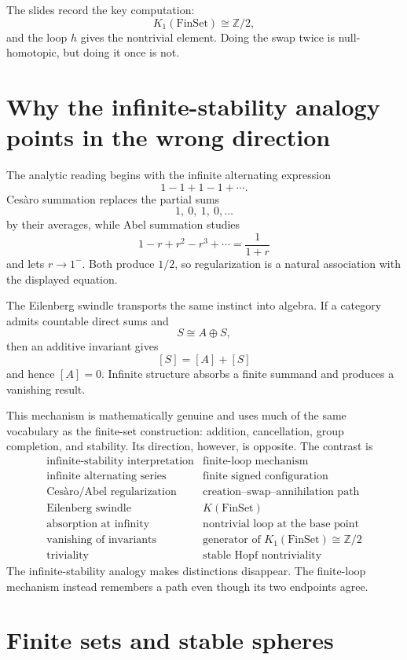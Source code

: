 The slides record the key computation:
\[
  K_1(\mathrm{FinSet})\cong\mathbb Z/2,
\]
and the loop \(h\) gives the nontrivial element.  Doing the swap twice is null-homotopic, but doing it once is not.

\section{Why the infinite-stability analogy points in the wrong direction}

The analytic reading begins with the infinite alternating expression
\[
  1-1+1-1+\cdots.
\]
Ces\`aro summation replaces the partial sums
\[
  1,\ 0,\ 1,\ 0,\ldots
\]
by their averages, while Abel summation studies
\[
  1-r+r^2-r^3+\cdots=\frac{1}{1+r}
\]
and lets \(r\to1^-\).  Both produce \(1/2\), so regularization is a natural association with the displayed equation.

The Eilenberg swindle transports the same instinct into algebra.  If a category admits countable direct sums and
\[
  S\cong A\oplus S,
\]
then an additive invariant gives
\[
  [S]=[A]+[S]
\]
and hence \([A]=0\).  Infinite structure absorbs a finite summand and produces a vanishing result.

This mechanism is mathematically genuine and uses much of the same vocabulary as the finite-set construction: addition, cancellation, group completion, and stability.  Its direction, however, is opposite.  The contrast is
\[
\begin{array}{c|c}
\text{infinite-stability interpretation} & \text{finite-loop mechanism}\\
\hline
\text{infinite alternating series} & \text{finite signed configuration}\\
\text{Ces\`aro/Abel regularization} & \text{creation--swap--annihilation path}\\
\text{Eilenberg swindle} & K(\mathrm{FinSet})\\
\text{absorption at infinity} & \text{nontrivial loop at the base point}\\
\text{vanishing of invariants} & \text{generator of }K_1(\mathrm{FinSet})\cong\mathbb Z/2\\
\text{triviality} & \text{stable Hopf nontriviality}
\end{array}
\]
The infinite-stability analogy makes distinctions disappear.  The finite-loop mechanism instead remembers a path even though its two endpoints agree.

\section{Finite sets and stable spheres}

